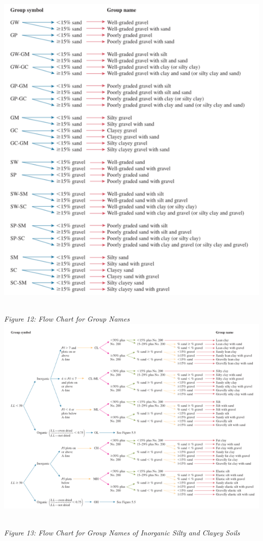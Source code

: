 \documentclass{article}
\begin{document}
\begin{center}
\includegraphics*[scale=0.7]{fig5.png}
\emph{\\Figure 12: Flow Chart for Group Names\\}
\includegraphics*[scale=0.8]{fig6.png}
\emph{\\Figure 13: Flow Chart for Group Names of Inorganic Silty and Clayey Soils\\}
\end{center}
\newpage
\end{document}
